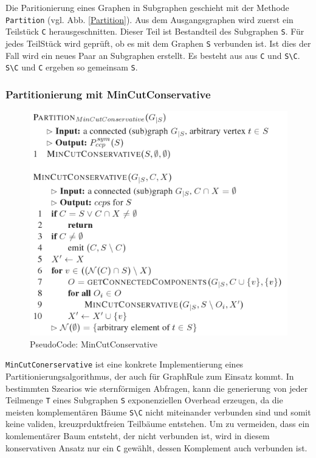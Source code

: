 Die Paritionierung eines Graphen in Subgraphen geschieht mit der Methode \texttt{Partition} (vgl. Abb. \ref{Partition}). Aus dem Ausgangsgraphen wird zuerst ein Teilstück \texttt{C} herausgeschnitten. Dieser Teil ist Bestandteil des Subgraphen \texttt{S}. Für jedes TeilStück wird geprüft, ob es mit dem Graphen \texttt{S} verbunden ist. Ist dies der Fall wird ein neues Paar an Subgraphen erstellt. Es besteht aus aus \texttt{C} und  \texttt{S\textbackslash C}. \texttt{S\textbackslash C} und \texttt{C} ergeben so gemeinsam \texttt{S}.


\subsubsection{Partitionierung mit MinCutConservative}

\begin{figure}[ht]
  \centering
  \includegraphics[scale=0.5]{03_Regeln/00_media/MinCutConservative.png}
  \caption{PseudoCode: MinCutConservative}
  \label{MinCutConservative}
\end{figure}

\texttt{MinCutConerservative} ist eine konkrete Implementierung eines Partitionierungsalgorithmus, der auch für GraphRule zum Einsatz kommt. In bestimmten Szearios wie sternförmigen Abfragen, kann die generierung von jeder Teilmenge \texttt{T} eines Subgraphen \texttt{S} exponenziellen Overhead erzeugen, da die meisten komplementären Bäume \texttt{S\textbackslash C} nicht miteinander verbunden sind und somit keine validen, kreuzprduktfreien Teilbäume entstehen. Um zu vermeiden, dass ein komlementärer Baum entsteht, der nicht verbunden ist, wird in diesem konservativen Ansatz nur ein \texttt{C} gewählt, dessen Komplement auch verbunden ist. 







